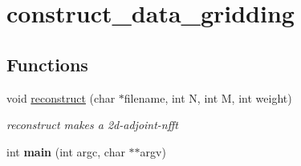 \hypertarget{group__applications__mri2d__construct__data__gridding}{
\section{construct\_\-data\_\-gridding}
\label{group__applications__mri2d__construct__data__gridding}
}
\subsection*{Functions}
\begin{CompactItemize}
\item 
\hypertarget{group__applications__mri2d__construct__data__gridding_ga0}{
void \hyperlink{group__applications__mri2d__construct__data__gridding_ga0}{reconstruct} (char $\ast$filename, int N, int M, int weight)}
\label{group__applications__mri2d__construct__data__gridding_ga0}

\begin{CompactList}\small\item\em reconstruct makes a 2d-adjoint-nfft \item\end{CompactList}\item 
\hypertarget{group__applications__mri2d__construct__data__gridding_ga1}{
int {\bf main} (int argc, char $\ast$$\ast$argv)}
\label{group__applications__mri2d__construct__data__gridding_ga1}

\end{CompactItemize}
